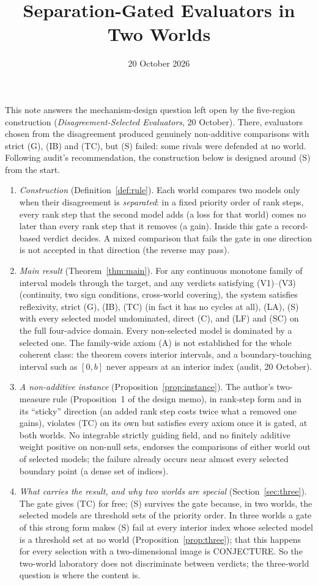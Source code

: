 \documentclass[11pt]{article}
\title{Separation-Gated Evaluators in Two Worlds}
\author{}\date{20 October 2026}
\theoremstyle{definition}\newtheorem{definition}[theorem]{Definition}
\theoremstyle{remark}\newtheorem{remark}[theorem]{Remark}
\begin{document}
\maketitle

\noindent
This note answers the mechanism-design question left open by the five-region
construction (\emph{Disagreement-Selected Evaluators}, 20 October). There,
evaluators chosen from the disagreement produced genuinely non-additive
comparisons with strict (G), (IB) and (TC), but (S) failed: some rivals were
defended at no world. Following audit's recommendation, the construction below
is designed around (S) from the start.

\begin{enumerate}[leftmargin=*,itemsep=3pt]
\item \emph{Construction} (Definition~\ref{def:rule}). Each world compares two
models only when their disagreement is \emph{separated}: in a fixed priority
order of rank steps, every rank step that the second model adds (a loss for that
world) comes no later than every rank step that it removes (a gain). Inside this
gate a record-based verdict decides. A mixed comparison that fails the gate
in one direction is not accepted in that direction (the reverse may pass).
\item \emph{Main result} (Theorem~\ref{thm:main}). For any continuous monotone
family of interval models through the target, and any verdicts satisfying
(V1)--(V3) (continuity, two sign conditions, cross-world covering), the system
satisfies reflexivity,
strict (G), (IB), (TC) (in fact it has no cycles at all), (LA), (S) with every
selected model undominated, direct (C), and (LF) and (SC) on the full
four-advice domain. Every non-selected model is dominated by a selected one.
The family-wide axiom (A) is not established for the whole coherent class:
the theorem covers interior intervals, and a boundary-touching interval such as
$[0,b]$ never appears at an interior index (audit, 20 October).
\item \emph{A non-additive instance} (Proposition~\ref{prop:instance}). The
author's two-measure rule (Proposition~1 of the design memo), in rank-step form
and in its ``sticky'' direction (an added rank step costs twice what a removed
one gains), violates (TC) on its own but satisfies every axiom once it is gated,
at both worlds. No integrable strictly guiding field, and no finitely additive
weight positive on non-null sets, endorses the comparisons of either world out
of selected models; the failure already occurs near almost every selected
boundary point (a dense set of indices).
\item \emph{What carries the result, and why two worlds are special}
(Section~\ref{sec:three}). The gate gives (TC) for free; (S) survives the gate
because, in two worlds, the selected models are threshold sets of the priority
order. In three worlds a gate of this strong form makes (S) fail at every
interior index whose selected model is a threshold set at no world
(Proposition~\ref{prop:three}); that this happens for every selection with a
two-dimensional image is CONJECTURE. So the two-world laboratory does not
discriminate between verdicts; the three-world question is where the content is.
\end{enumerate}
\end{document}
